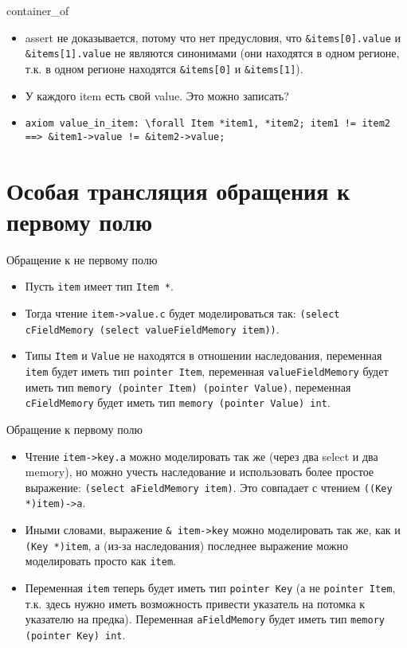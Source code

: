 \documentclass[hyperref={unicode=true}]{beamer}
\begin{document}
    \begin{frame}{container\_of}
    \begin{itemize}
    \item
    assert не доказывается, потому что нет предусловия, что
    \texttt{\&items[0].value} и \texttt{\&items[1].value}
    не являются синонимами (они находятся в одном регионе,
    т.к. в одном регионе находятся \texttt{\&items[0]} и
    \texttt{\&items[1]}).
    \item
    У каждого item есть свой value. Это можно записать?
    \item
    \texttt{axiom value\_in\_item: \textbackslash{}forall Item *item1, *item2;
    item1 != item2 ==> \&item1->value != \&item2->value;}
    \end{itemize}
    \end{frame}

    \section{Особая трансляция обращения к первому полю}

    \begin{frame}{Обращение к не первому полю}
    \begin{itemize}
    \item
    Пусть \texttt{item} имеет тип \texttt{Item *}.
    \item
    Тогда чтение \texttt{item->value.c} будет моделироваться
    так: \texttt{(select cFieldMemory (select valueFieldMemory item))}.
    \item
    Типы \texttt{Item} и \texttt{Value} не находятся
    в отношении наследования, переменная \texttt{item}
    будет иметь тип \texttt{pointer Item}, переменная
    \texttt{valueFieldMemory} будет иметь тип
    \texttt{memory (pointer Item) (pointer Value)},
    переменная \texttt{cFieldMemory} будет иметь тип
    \texttt{memory (pointer Value) int}.
    \end{itemize}
    \end{frame}

    \begin{frame}{Обращение к первому полю}
    \begin{itemize}
    \item
    Чтение \texttt{item->key.a} можно моделировать так же
    (через два select и два memory), но можно учесть
    наследование и использовать более простое выражение:
    \texttt{(select aFieldMemory item)}. Это совпадает
    с чтением \texttt{((Key *)item)->a}.
    \item
    Иными словами,
    выражение \texttt{\& item->key} можно моделировать так же,
    как и \texttt{(Key *)item}, а (из-за наследования)
    последнее выражение можно моделировать просто как \texttt{item}.
    \item
    Переменная \texttt{item} теперь будет иметь тип
    \texttt{pointer Key} (а не \texttt{pointer Item},
    т.к. здесь нужно иметь возможность привести
    указатель на потомка к указателю на предка). Переменная
    \texttt{aFieldMemory} будет иметь тип
    \texttt{memory (pointer Key) int}.
    \end{itemize}
    \end{frame}
\end{document}
